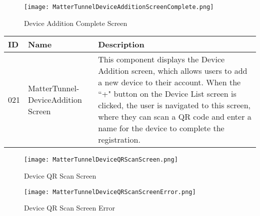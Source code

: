 \documentclass[conference]{IEEEtran}
\begin{document}
\begin{enumerate}[itemsep=2ex, parsep=1ex]
\begin{enumerate}[itemsep=2ex, parsep=1ex]
	      	      \begin{figure}[h!]
	      	      	\centering
	      	      	\texttt{[image: MatterTunnelDeviceAdditionScreenComplete.png]}
	      	      	\caption{Device Addition Complete Screen}
	      	      	\label{fig:DeviceAdditionCompleteScreen}
	      	      \end{figure}
	      	      \begin{table}[h!]
	      	      	\def\arraystretch{1.24} \small
	      	      	\begin{tabular}{|p{1.2cm}|p{2.5cm}|p{4.0cm}|}
	      	      		\hline
	      	      		ID  & Name                              & Description                                                                                                                                                                                                                                                                                               \\
	      	      		\hline
	      	      		021 & MatterTunnel-DeviceAddition Screen & This component displays the Device Addition screen, which allows users to add a new device to their account. When the ``+" button on the Device List screen is clicked, the user is navigated to this screen, where they can scan a QR code and enter a name for the device to complete the registration. \\
	      	      		\hline
	      	      	\end{tabular}
	      	      \end{table}

                  \vspace{5cm}
	      	      
	      	      \begin{figure}[h!]
	      	      	\centering
	      	      	\texttt{[image: MatterTunnelDeviceQRScanScreen.png]}
	      	      	\caption{Device QR Scan Screen}
	      	      	\label{fig:DeviceQRScanScreen}
	      	      \end{figure}
	      	      
	      	      \begin{figure}[h!]
	      	      	\centering
	      	      	\texttt{[image: MatterTunnelDeviceQRScanScreenError.png]}
	      	      	\caption{Device QR Scan Screen Error}
	      	      	\label{fig:MatterTunnelDeviceQRScanScreenError}
	      	      \end{figure}
	      	                        

\end{enumerate}
\end{enumerate}
\end{document}
